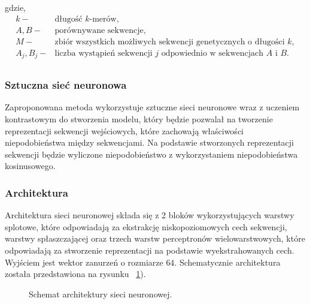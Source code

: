                 gdzie,
                \begin{align*} 
                    k -& \text{długość $k$-merów}, \\
                    A, B -& \text{porównywane sekwencje}, \\
                    M -& \text{zbiór wszystkich możliwych sekwencji genetycznych o długości $k$}, \\
                    A_j, B_j -& \text{liczba wystąpień sekwencji } j \text{ odpowiednio w sekwencjach } A \text{ i } B. \\
                \end{align*}
            
            \subsubsection{Sztuczna sieć neuronowa}
            
                Zaproponowana metoda wykorzystuje sztuczne sieci neuronowe wraz z uczeniem kontrastowym do stworzenia modelu, który będzie pozwalał na tworzenie reprezentacji sekwencji wejściowych, które zachowają właściwości niepodobieństwa między sekwencjami. Na podstawie stworzonych reprezentacji sekwencji będzie wyliczone niepodobieństwo z wykorzystaniem niepodobieństwa kosinusowego.
    
                \subsubsection{Architektura}
    
                    Architektura sieci neuronowej składa się z 2 bloków wykorzystujących warstwy splotowe, które odpowiadają za ekstrakcję niskopoziomowych cech sekwencji, warstwy spłaszczającej oraz trzech warstw perceptronów wielowarstwowych, które odpowiadają za stworzenie reprezentacji na podstawie wyekstrahowanych cech. Wyjściem jest wektor zanurzeń o rozmiarze $64$. Schematycznie architektura została przedstawiona na rysunku ~\ref{Architektura}).
    
                    \begin{figure}[H]
                        \begin{center}
                            
                        \end{center}
                        \caption{
                            Schemat architektury sieci neuronowej.
                        } 
                        \label{Architektura}
                    \end{figure}
    
